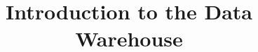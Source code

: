 \documentclass{vldb}
\begin{document}


\title{Introduction to the Data Warehouse}



%
%
%
%

\end{document}
